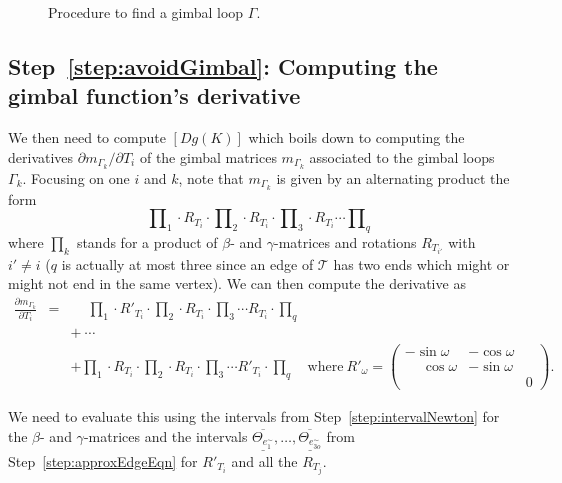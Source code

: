 \documentclass[utopia,fullpage]{nmd/article}
\newcommand{\negSpace}{\!}
\newcommand{\negSpace}{}
\newcommand\du[1]{\underline{\overline{#1}}}
\newcommand\trig{\mathcal{T}}
\newcommand\myPath{\Gamma}
\begin{document}
\begin{figure}[h]
\begin{center}
\scalebox{0.14}{
}
\end{center}
\caption{Procedure to find a gimbal loop $\myPath$.} \label{fig:findingAGimbalLoop}
\end{figure}

\subsection{Step~\ref{step:avoidGimbal}: Computing the gimbal function's derivative}

We then need to compute $[Dg(K)]$ which boils down to computing the derivatives $\partial m_{\myPath_k}/\partial T_i$ of the gimbal matrices $m_{\myPath_k}$ associated to the gimbal loops $\myPath_k$. Focusing on one $i$ and $k$, note that $m_{\myPath_k}$ is given by an alternating product the form
$$
\prod\nolimits_1 \cdot R_{T_i}\cdot \prod\nolimits_2  \cdot R_{T_i} \cdot \prod\nolimits_3 \cdot R_{T_i} \cdots \prod\nolimits_q
$$
where $\prod\nolimits_k$ stands for a product of $\beta$- and $\gamma$-matrices and rotations $R_{T_{i'}}$ with $i'\not=i$ ($q$ is actually at most three since an edge of $\trig$\negSpace{} has two ends which might or might not end in the same vertex). We can then compute the derivative as
\begin{eqnarray*}
\frac{\partial m_{\myPath_k}}{\partial T_i} &=& \phantom{+} \prod\nolimits_1 \cdot R'_{T_i}\cdot \prod\nolimits_2  \cdot R_{T_i} \cdot \prod\nolimits_3 \cdots R_{T_i} \cdot \prod\nolimits_q\\
 & & + ~ \cdots \\
 & & +\prod\nolimits_1 \cdot R_{T_i}\cdot \prod\nolimits_2  \cdot R_{T_i} \cdot \prod\nolimits_3 \cdots R'_{T_i} \cdot \prod\nolimits_q \quad \mbox{where}~
R'_\omega = \left(\begin{array}{ccc} -\sin\omega & -\cos\omega & \\ \phantom{-}\cos\omega & -\sin\omega & \\ & & 0\end{array}\right).
\end{eqnarray*}

We need to evaluate this using the intervals from Step~\ref{step:intervalNewton} for the $\beta$- and $\gamma$-matrices and the intervals $\du{\Theta_{e^\sim_1}},\dots,\du{\Theta_{e^\sim_{3o}}}$ from Step~\ref{step:approxEdgeEqn} for $R'_{T_i}$ and all the $R_{T_j}$.
\end{document}
